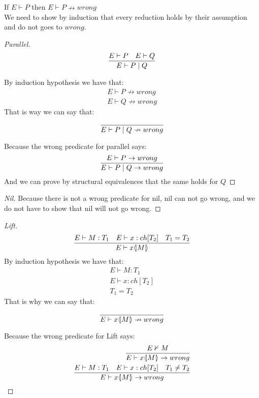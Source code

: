 \begin{theorem}
If \ensuremath{E \vdash P} then \ensuremath{E \vdash P \nrightarrow wrong}\\
We need to show by induction that every reduction holds by their assumption and do not goes to \ensuremath{wrong}.
\begin{proof}[Parallel]
\begin{align*}
\frac{E \vdash P \quad E \vdash Q }{E \vdash P \mid Q}
\end{align*}

By induction hypothesis we have that: 
\begin{align*}
E \vdash P \nrightarrow wrong\\
E \vdash Q \nrightarrow wrong
\end{align*}
That is way we can say that:
\begin{align*}
\frac{}{E \vdash P \mid Q \nrightarrow wrong}
\end{align*}

Because the wrong predicate for parallel says:
\begin{align*}
\frac{E \vdash P \rightarrow wrong}{E \vdash P \mid Q \rightarrow wrong}
\end{align*}
And we can prove by structural equivalences that the same holds for \ensuremath{Q}
\end{proof}

\begin{proof}[Nil]
Because there is not a wrong predicate for nil, nil can not go wrong, and we do not have to show that nil will not go wrong.
\end{proof}

\begin{proof}[Lift]
\begin{align*}
\frac{E \vdash M:T_1 \quad E \vdash x:ch[T_2] \quad T_1 = T_2}{E \vdash x \langle \! | M | \! \rangle}
\end{align*}
By induction hypothesis we have that:
\begin{align*}
E \vdash M:T_1\\
E \vdash x:ch[T_2]\\
T_1 = T_2
\end{align*}
That is why we can say that:
\begin{align*}
\frac{}{E \vdash x \langle \! | M | \! \rangle \nrightarrow wrong}
\end{align*}

Because the wrong predicate for Lift says:
\begin{align*}
\frac{E \nvdash M}{E \vdash x \langle \! | M | \! \rangle \rightarrow wrong}\\
\frac{E \vdash M:T_1 \quad E \vdash x:ch[T_2] \quad T_1 \neq T_2}{E \vdash x \langle \! | M | \! \rangle \rightarrow wrong}
\end{align*}


\end{proof}
\end{theorem}
